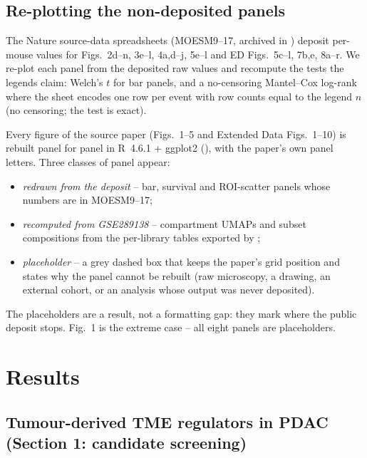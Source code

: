 \documentclass[preprint,12pt]{elsarticle}
\begin{document}
\subsection{Re-plotting the non-deposited panels}

The Nature source-data spreadsheets (MOESM9--17, archived in
) deposit per-mouse
values for Figs.~2d--n, 3e--l, 4a,d--j, 5e--l and ED Figs.~5c--l,
7b,e, 8a--r. We re-plot each panel from the deposited raw values and
recompute the tests the legends claim: Welch's $t$ for bar panels,
and a no-censoring Mantel--Cox log-rank where the sheet encodes one
row per event with row counts equal to the legend $n$ (no censoring;
the test is exact).

Every figure of the source paper (Figs.~1--5 and Extended Data
Figs.~1--10) is rebuilt panel for panel in R~4.6.1 + ggplot2
(), with the paper's own panel
letters. Three classes of panel appear:

\begin{itemize}
\item \emph{redrawn from the deposit} -- bar, survival and ROI-scatter
  panels whose numbers are in MOESM9--17;
\item \emph{recomputed from GSE289138} -- compartment UMAPs and subset
  compositions from the per-library tables exported by
  ;
\item \emph{placeholder} -- a grey dashed box that keeps the paper's
  grid position and states why the panel cannot be rebuilt (raw
  microscopy, a drawing, an external cohort, or an analysis whose
  output was never deposited).
\end{itemize}

The placeholders are a result, not a formatting gap: they mark where
the public deposit stops. Fig.~1 is the extreme case -- all eight
panels are placeholders.


\section{Results}

\subsection{Tumour-derived TME regulators in PDAC
(Section 1: candidate screening)}
\end{document}
